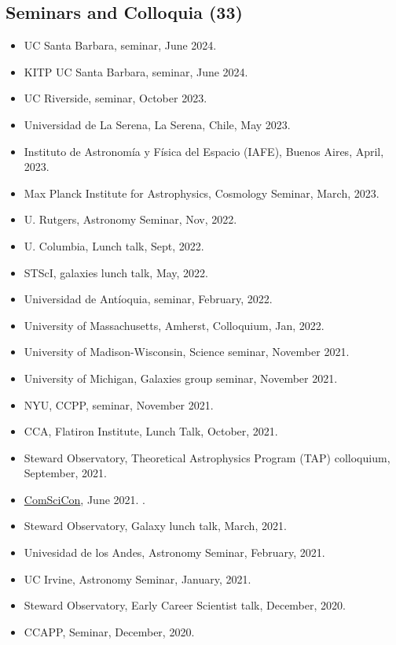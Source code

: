 \documentclass[14pt]{article}
\begin{document}
\subsection*{Seminars and Colloquia (33)}
\begin{itemize}
  \setlength\itemsep{0.0em}
  \renewcommand\labelitemi{$\cdot$}


\item UC Santa Barbara, seminar, June 2024. \dag
\item KITP UC Santa Barbara, seminar, June 2024. \dag
\item UC Riverside, seminar, October 2023. \dag
\item Universidad de La Serena, La Serena, Chile, May 2023. \dag 
\item Instituto de Astronom\'ia y F\'isica del Espacio (IAFE), Buenos Aires, April, 2023.
\item Max Planck Institute for Astrophysics, Cosmology Seminar, March, 2023.
\item U. Rutgers, Astronomy Seminar, Nov, 2022. \dag
\item U. Columbia, Lunch talk, Sept, 2022. \dag
\item STScI, galaxies lunch talk, May, 2022. \dag
\item Universidad de Ant\'ioquia, seminar, February, 2022. \dag 
\item University of Massachusetts, Amherst, Colloquium, Jan, 2022. \dag
\item University of Madison-Wisconsin, Science seminar, November 2021.\dag
\item University of Michigan, Galaxies group seminar, November 2021.\dag
\item NYU, CCPP, seminar, November 2021.\dag 
\item CCA, Flatiron Institute, Lunch Talk, October, 2021.
\item Steward Observatory, Theoretical Astrophysics Program (TAP) colloquium, September, 2021.\dag
\item \href{https://comscicon.com/comscicon-en-espa%C3%B1ol-2021}{ComSciCon},
    June 2021. \dag. 
\item Steward Observatory, Galaxy lunch talk, March, 2021.
\item Univesidad de los Andes, Astronomy Seminar, February, 2021. 
\item UC Irvine, Astronomy Seminar, January, 2021. \dag
\item Steward Observatory, Early Career Scientist talk, December, 2020. \dag
\item CCAPP, Seminar, December, 2020. \dag

\end{itemize}
\end{document}
